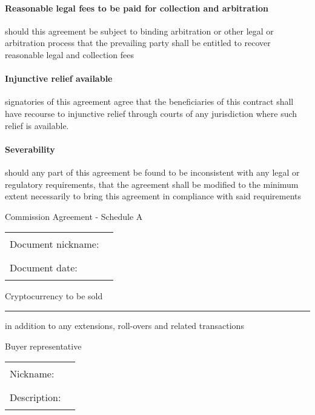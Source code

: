 \documentclass[10pt]{article}
\begin{document}
\paragraph{Reasonable legal fees to be paid for collection and
  arbitration} should this agreement be subject to binding arbitration
or other legal or arbitration process that the prevailing party shall
be entitled to recover reasonable legal and collection fees

\paragraph{Injunctive relief available} signatories of this agreement
agree that the beneficiaries of this contract shall have recourse to
injunctive relief through courts of any jurisdiction where such relief
is available.

\paragraph{Severability} should any part of this agreement be found to
be inconsistent with any legal or regulatory requirements, that the
agreement shall be modified to the minimum extent necessarily to bring
this agreement in compliance with said requirements

\pagebreak
\begin{center}
{\Large Commission Agreement - Schedule A}
\end{center}

\begin{tabular}{l l}
  Document nickname: & \rule{5cm}{.2pt}\\
  Document date: & \rule{5cm}{.2pt}\\
\end{tabular}

\vspace{1cm}

\begin{center}
Cryptocurrency to be sold
\end{center}

\rule{15cm}{.2pt} in addition to any extensions, roll-overs and
related transactions

\vspace{1cm}
\begin{center}
Buyer representative
\end{center}

\begin{tabular}{l l}
Nickname: & \rule{5cm}{.2pt} \\
Description: & \rule{5cm}{.2pt} \\
\end{tabular}
\vspace{1cm}
\end{document}

